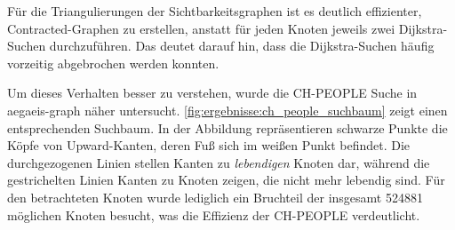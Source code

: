 Für die Triangulierungen der Sichtbarkeitsgraphen ist es deutlich effizienter, Contracted-Graphen zu erstellen, anstatt für jeden Knoten jeweils zwei Dijkstra-Suchen durchzuführen.
Das deutet darauf hin, dass die Dijkstra-Suchen häufig vorzeitig abgebrochen werden konnten.

Um dieses Verhalten besser zu verstehen, wurde die CH-PEOPLE Suche in aegaeis-graph näher untersucht.
\autoref{fig:ergebnisse:ch_people_suchbaum} zeigt einen entsprechenden Suchbaum.
In der Abbildung repräsentieren schwarze Punkte die Köpfe von Upward-Kanten, deren Fuß sich im weißen Punkt befindet.
Die durchgezogenen Linien stellen Kanten zu \emph{lebendigen} Knoten dar, während die gestrichelten Linien Kanten zu Knoten zeigen, die nicht mehr lebendig sind.
Für den betrachteten Knoten wurde lediglich ein Bruchteil der insgesamt \num{524881} möglichen Knoten besucht, was die Effizienz der CH-PEOPLE verdeutlicht.


